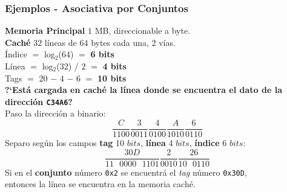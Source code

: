 \documentclass[aspectratio=169]{beamer}
\begin{document}
\begin{frame}[t]
    \frametitle{Ejemplos - Asociativa por Conjuntos}
    \small 
    \textbf{Memoria Principal} $1$ MB, direccionable a byte.\\
    \textbf{Caché}  $32$ l\'ineas de $64$ bytes cada una, 2 v\'ias.\\
    \bigskip
    \textcolor{naranjauca}{Índice} $=$ log$_2$(64) $=$ \textbf{6 bits}\\
    \textcolor{naranjauca}{Línea} $=$ log$_2$(32) / $2$ $=$ \textbf{4 bits}\\
    \textcolor{naranjauca}{Tags} $=$ $20$ $-$ $4$ $-$ $6$ $=$ \textbf{10 bits}\\
    \bigskip
    \textbf{?`Está cargada en caché la línea donde se encuentra el dato de la direcci\'on \texttt{C34A6}?}\\
    \vskip 5pt
    \small
    Paso la dirección a binario:\\
    \vskip -15pt
    \begin{equation*}
    \text{}\frac{C}{1100} \frac{3}{0011} \frac{4}{0100} \frac{A}{1010} \frac{6}{0110}
    \end{equation*}
    Separo seg\'un los campos \textbf{tag} 10 $bits$, \textbf{l\'inea} 4 $bits$, \textbf{\'indice} 6 $bits$:\\
    \vskip -5pt
    \begin{equation*}
    \text{}\frac{30D}{11\text{ }0000\text{ }1101} \frac{2}{0010} \frac{26}{10\text{ }0110}
    \end{equation*}
    Si en el \textbf{conjunto} número \texttt{0x2} se encuentrá el \emph{tag} n\'umero \texttt{0x30D},\\
    entonces la línea se encuentra en la memoria caché.
\end{frame}
\end{document}
